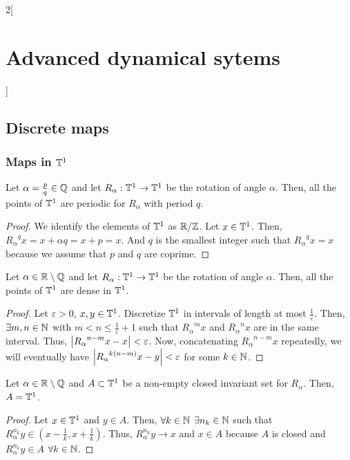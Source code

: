 \documentclass[../../../main_math.tex]{subfiles}
\begin{document}
\begin{multicols}{2}[\section{Advanced dynamical sytems}]
  \subsection{Discrete maps}
  \subsubsection{Maps in \texorpdfstring{$\mathbb{T}^1$}{S1}}
  \begin{proposition}
    Let $\alpha=\frac{p}{q}\in\mathbb{Q}$ and let $R_\alpha:\mathbb{T}^1\to \mathbb{T}^1$ be the rotation of angle $\alpha$. Then, all the points of $\mathbb{T}^1$ are periodic for $R_\alpha$ with period $q$.
  \end{proposition}
  \begin{proof}
    We identify the elements of $\mathbb{T}^1$ as $\quot{\RR}{\ZZ}$. Let $x\in \mathbb{T}^1$. Then, ${R_\alpha}^q x=x+\alpha q=x+p=x$. And $q$ is the smallest integer such that ${R_\alpha}^q x=x$ because we assume that $p$ and $q$ are coprime.
  \end{proof}
  \begin{proposition}
    Let $\alpha\in\mathbb{R}\setminus\mathbb{Q}$ and let $R_\alpha:\mathbb{T}^1\to \mathbb{T}^1$ be the rotation of angle $\alpha$. Then, all the points of $\mathbb{T}^1$ are dense in $\mathbb{T}^1$.
  \end{proposition}
  \begin{proof}
    Let $\varepsilon>0$, $x,y\in \mathbb{T}^1$. Discretize $\mathbb{T}^1$ in intervals of length at most $\frac{1}{\varepsilon}$. Then, $\exists m,n\in \mathbb{N}$ with $m< n\leq \frac{1}{\varepsilon}+1$ such that ${R_\alpha}^m x$ and ${R_\alpha}^nx$ are in the same interval. Thus, $\abs{{R_\alpha}^{n-m}x-x}<\varepsilon$. Now, concatenating ${R_\alpha}^{n-m}x$ repeatedly, we will eventually have $\abs{{R_\alpha}^{k(n-m)}x - y}<\varepsilon$ for some $k\in \mathbb{N}$.
  \end{proof}
  \begin{corollary}
    Let $\alpha\in\mathbb{R}\setminus\mathbb{Q}$ and $A\subset \mathbb{T}^1$ be a non-empty closed invariant set for $R_\alpha$. Then, $A=\mathbb{T}^1$.
  \end{corollary}
  \begin{proof}
    Let $x\in \mathbb{T}^1$ and $y\in A$. Then, $\forall k\in\mathbb{N}$ $\exists n_k\in\mathbb{N}$ such that $R_\alpha^{n_k}y\in(x-\frac{1}{k},x+\frac{1}{k})$. Thus, $R_\alpha^{n_k}y\to x$ and $x\in A$ because $A$ is closed and $R_\alpha^{n_k}y\in A$ $\forall k\in\mathbb{N}$.

\end{proof}
\end{multicols}
\end{document}
